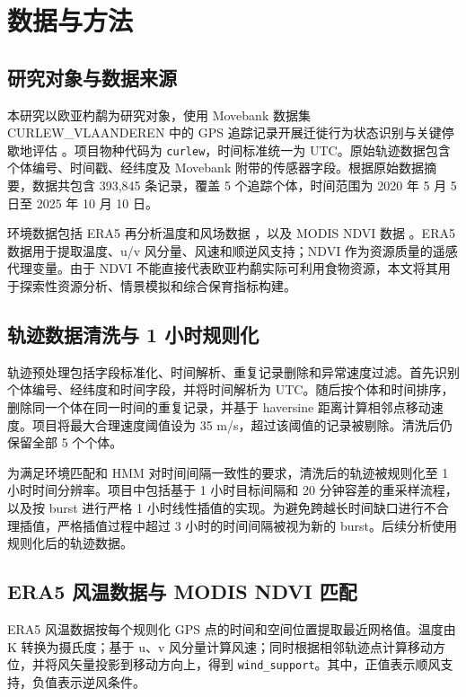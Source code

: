 \documentclass[UTF8,a4paper,12pt]{ctexart}
\begin{document}
\section{数据与方法}

\subsection{研究对象与数据来源}

本研究以欧亚杓鹬为研究对象，使用 Movebank 数据集 CURLEW\allowbreak\_VLAANDEREN 中的 GPS 追踪记录开展迁徙行为状态识别与关键停歇地评估 \citep{movebankplaceholder}。项目物种代码为 \texttt{curlew}，时间标准统一为 UTC。原始轨迹数据包含个体编号、时间戳、经纬度及 Movebank 附带的传感器字段。根据原始数据摘要，数据共包含 393,845 条记录，覆盖 5 个追踪个体，时间范围为 2020 年 5 月 5 日至 2025 年 10 月 10 日。

环境数据包括 ERA5 再分析温度和风场数据 \citep{era5placeholder}，以及 MODIS NDVI 数据 \citep{modisndviplaceholder}。ERA5 数据用于提取温度、u/v 风分量、风速和顺逆风支持；NDVI 作为资源质量的遥感代理变量。由于 NDVI 不能直接代表欧亚杓鹬实际可利用食物资源，本文将其用于探索性资源分析、情景模拟和综合保育指标构建。

\subsection{轨迹数据清洗与 1 小时规则化}

轨迹预处理包括字段标准化、时间解析、重复记录删除和异常速度过滤。首先识别个体编号、经纬度和时间字段，并将时间解析为 UTC。随后按个体和时间排序，删除同一个体在同一时间的重复记录，并基于 haversine 距离计算相邻点移动速度。项目将最大合理速度阈值设为 35 m/s，超过该阈值的记录被剔除。清洗后仍保留全部 5 个个体。

为满足环境匹配和 HMM 对时间间隔一致性的要求，清洗后的轨迹被规则化至 1 小时时间分辨率。项目中包括基于 1 小时目标间隔和 20 分钟容差的重采样流程，以及按 burst 进行严格 1 小时线性插值的实现。为避免跨越长时间缺口进行不合理插值，严格插值过程中超过 3 小时的时间间隔被视为新的 burst。后续分析使用规则化后的轨迹数据。

\subsection{ERA5 风温数据与 MODIS NDVI 匹配}

ERA5 风温数据按每个规则化 GPS 点的时间和空间位置提取最近网格值。温度由 K 转换为摄氏度；基于 u、v 风分量计算风速；同时根据相邻轨迹点计算移动方位，并将风矢量投影到移动方向上，得到 \texttt{wind\_support}。其中，正值表示顺风支持，负值表示逆风条件。
\end{document}
